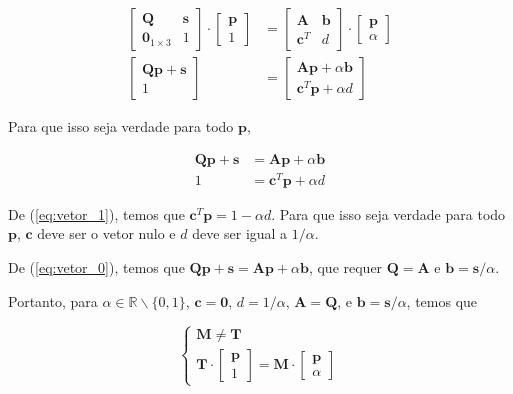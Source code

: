 \documentclass[a4paper]{article}
\begin{document}
\begin{align}
    \begin{bmatrix}
        \mathbf{Q} & \mathbf{s} \\
        \mathbf{0}_{1\times 3} & 1
    \end{bmatrix}\cdot\begin{bmatrix}\mathbf{p} \\ 1\end{bmatrix} &=
    \begin{bmatrix}
        \mathbf{A} & \mathbf{b} \\
        \mathbf{c}^T & d
    \end{bmatrix}\cdot\begin{bmatrix}\mathbf{p} \\ \alpha\end{bmatrix} \\
    \begin{bmatrix}
        \mathbf{Q}\mathbf{p} + \mathbf{s} \\
        1
    \end{bmatrix} &=
    \begin{bmatrix}
        \mathbf{A}\mathbf{p} + \alpha\mathbf{b} \\
        \mathbf{c}^T\mathbf{p} + \alpha d
    \end{bmatrix}
\end{align}

Para que isso seja verdade para todo $\mathbf{p}$,

\begin{align}
    \mathbf{Q}\mathbf{p} + \mathbf{s} &=
    \mathbf{A}\mathbf{p} + \alpha\mathbf{b} \label{eq:vetor_0} \\
    1 &=
    \mathbf{c}^T\mathbf{p} + \alpha d \label{eq:vetor_1}
\end{align}

De (\ref{eq:vetor_1}), temos que $\mathbf{c}^T\mathbf{p} = 1 - \alpha d$. Para que isso seja verdade para todo $\mathbf{p}$, $\mathbf{c}$ deve ser o vetor nulo e $d$ deve ser igual a $1/\alpha$.

De (\ref{eq:vetor_0}), temos que $\mathbf{Q}\mathbf{p} + \mathbf{s} = \mathbf{A}\mathbf{p} + \alpha\mathbf{b}$, que requer $\mathbf{Q} = \mathbf{A}$ e $\mathbf{b} = \mathbf{s}/\alpha$.

Portanto, para $\alpha \in \mathbb{R} \backslash \{0, 1\}$, $\mathbf{c} = \mathbf{0}$, $d = 1/\alpha$, $\mathbf{A} = \mathbf{Q}$, e $\mathbf{b} = \mathbf{s}/\alpha$, temos que

\begin{equation}
    \begin{cases}
        \mathbf{M} \neq \mathbf{T} \\
        \mathbf{T}\cdot\begin{bmatrix}\mathbf{p} \\ 1\end{bmatrix} =
        \mathbf{M}\cdot\begin{bmatrix}\mathbf{p} \\ \alpha\end{bmatrix}
    \end{cases}
\end{equation}
\end{document}

